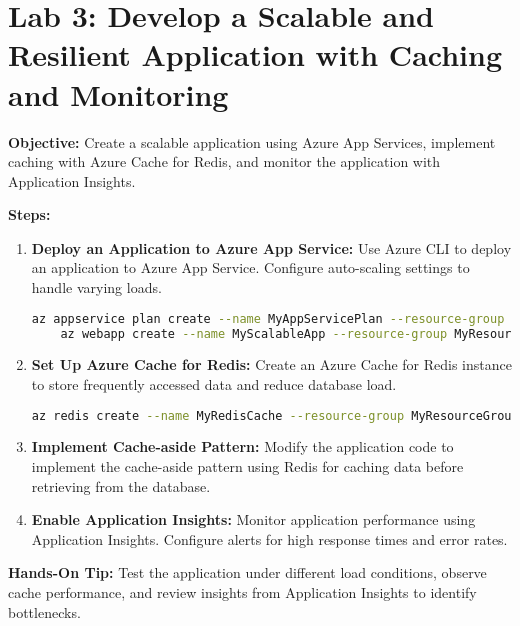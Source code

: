 \documentclass{article}
\begin{document}
\section{Lab 3: Develop a Scalable and Resilient Application with Caching and Monitoring}
\textbf{Objective:} Create a scalable application using Azure App Services, implement caching with Azure Cache for Redis, and monitor the application with Application Insights.

\textbf{Steps:}
\begin{enumerate}
    \item \textbf{Deploy an Application to Azure App Service:} Use Azure CLI to deploy an application to Azure App Service. Configure auto-scaling settings to handle varying loads.
    \begin{lstlisting}[language=bash]
    az appservice plan create --name MyAppServicePlan --resource-group MyResourceGroup --sku S1 --is-linux
    az webapp create --name MyScalableApp --resource-group MyResourceGroup --plan MyAppServicePlan
    \end{lstlisting}

    \item \textbf{Set Up Azure Cache for Redis:} Create an Azure Cache for Redis instance to store frequently accessed data and reduce database load.
    \begin{lstlisting}[language=bash]
    az redis create --name MyRedisCache --resource-group MyResourceGroup --location eastus --sku Standard --vm-size c1
    \end{lstlisting}

    \item \textbf{Implement Cache-aside Pattern:} Modify the application code to implement the cache-aside pattern using Redis for caching data before retrieving from the database.

    \item \textbf{Enable Application Insights:} Monitor application performance using Application Insights. Configure alerts for high response times and error rates.
\end{enumerate}

\textbf{Hands-On Tip:} Test the application under different load conditions, observe cache performance, and review insights from Application Insights to identify bottlenecks.
\end{document}
